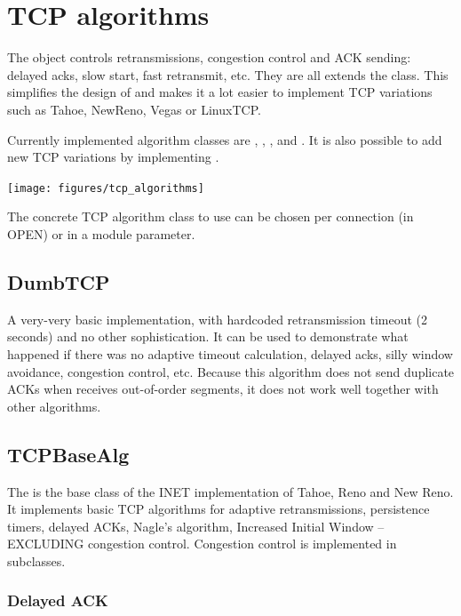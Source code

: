 \section{TCP algorithms}
\label{sec:tcp_algorithms}

The  object controls
retransmissions, congestion control and ACK sending: delayed acks, slow start,
fast retransmit, etc. They are all extends the  class.
This simplifies the design of  and makes it a lot easier to
implement TCP variations such as Tahoe, NewReno, Vegas or LinuxTCP.

Currently implemented algorithm classes are ,
, , 
and . It is also possible to add new TCP variations
by implementing .

\texttt{[image: figures/tcp\_algorithms]}

The concrete TCP algorithm class to use can be chosen per connection (in OPEN)
or in a module parameter.

\subsection{DumbTCP}

A very-very basic  implementation, with hardcoded
retransmission timeout (2 seconds) and no other sophistication. It can be
used to demonstrate what happened if there was no adaptive
timeout calculation, delayed acks, silly window avoidance,
congestion control, etc. Because this algorithm does not
send duplicate ACKs when receives out-of-order segments,
it does not work well together with other algorithms.

\subsection{TCPBaseAlg}

The  is the base class of the INET implementation
of Tahoe, Reno and New Reno. It implements basic TCP
algorithms for adaptive retransmissions, persistence timers,
delayed ACKs, Nagle's algorithm, Increased Initial Window
-- EXCLUDING congestion control. Congestion control
is implemented in subclasses.

\subsubsection*{Delayed ACK}

